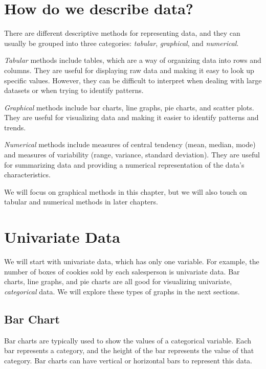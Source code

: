 \section{How do we describe data?}


There are different descriptive methods for representing data, and they can usually be grouped into three categories:
\textit{tabular}, \textit{graphical}, and \textit{numerical}.

\textit{Tabular} methods include tables, which are a way of organizing data into rows and columns.
They are useful for displaying raw data and making it easy to look up specific values. However,
they can be difficult to interpret when dealing with large datasets or when trying to identify patterns.

\textit{Graphical} methods include bar charts, line graphs, pie charts, and scatter plots.
They are useful for visualizing data and making it easier to identify patterns and trends.

\textit{Numerical} methods include measures of central tendency (mean, median, mode) and measures of variability (range, variance, standard deviation).
They are useful for summarizing data and providing a numerical representation of the data's characteristics.

We will focus on graphical methods in this chapter, but we will also touch on tabular and numerical methods in later chapters.

\section{Univariate Data}
We will start with univariate data, which has only one variable.
For example, the number of boxes of cookies sold by each salesperson is univariate data. Bar charts, line graphs,
and pie charts are all good for visualizing univariate, \textit{categorical} data. We will explore these types of graphs in the next sections.

\subsection{Bar Chart}

Bar charts are typically used to show the values of a categorical variable. Each bar represents a category,
and the height of the bar represents the value of that category. Bar charts can have vertical or horizontal bars to represent this data.


